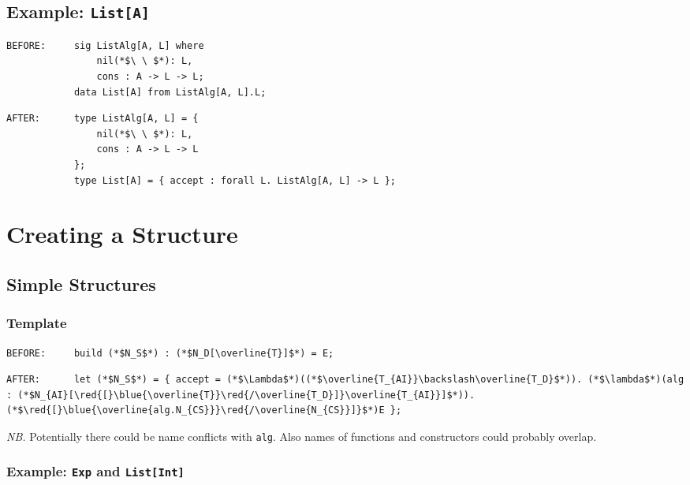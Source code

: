 \documentclass{article}
\newcommand{\red}[1]{\textcolor{red}{#1}}
\newcommand{\blue}[1]{\textcolor{blue}{#1}}
\newcommand{\nb}{\textit{NB. }}
\begin{document}
\begin{spacing}{1.1}
\subsection{Example: \lstinline{List[A]}}

\begin{lstlisting}[numbers=none]
BEFORE:     sig ListAlg[A, L] where
                nil(*$\ \ $*): L,
                cons : A -> L -> L;
            data List[A] from ListAlg[A, L].L;
\end{lstlisting}
\begin{lstlisting}[numbers=none]
AFTER:      type ListAlg[A, L] = {
                nil(*$\ \ $*): L,
                cons : A -> L -> L
            };
            type List[A] = { accept : forall L. ListAlg[A, L] -> L };
\end{lstlisting}

\section{Creating a Structure}

\subsection{Simple Structures}

\subsubsection{Template}

\begin{lstlisting}[numbers=none]
BEFORE:     build (*$N_S$*) : (*$N_D[\overline{T}]$*) = E;
\end{lstlisting}
\begin{lstlisting}[numbers=none]
AFTER:      let (*$N_S$*) = { accept = (*$\Lambda$*)((*$\overline{T_{AI}}\backslash\overline{T_D}$*)). (*$\lambda$*)(alg : (*$N_{AI}[\red{[}\blue{\overline{T}}\red{/\overline{T_D}]}\overline{T_{AI}}]$*)). (*$\red{[}\blue{\overline{alg.N_{CS}}}\red{/\overline{N_{CS}}]}$*)E };
\end{lstlisting}

\nb Potentially there could be name conflicts with \lstinline{alg}. Also names of functions and constructors could probably overlap.

\subsubsection{Example: \lstinline{Exp} and \lstinline{List[Int]}}


\end{spacing}
\end{document}
